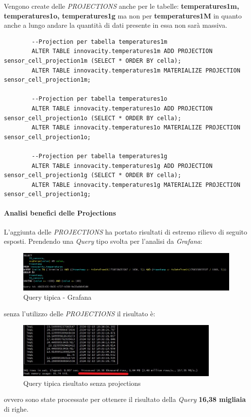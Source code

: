     Vengono create delle \textit{PROJECTIONS} anche per le tabelle:  \textbf{temperatures1m, temperatures1o, temperatures1g}
    ma non per  \textbf{temperatures1M} in quanto anche a lungo andare la quantità di dati presente in essa non sarà massiva.

    \begin{lstlisting}
        --Projection per tabella temperatures1m
        ALTER TABLE innovacity.temperatures1m ADD PROJECTION sensor_cell_projection1m (SELECT * ORDER BY cella);
        ALTER TABLE innovacity.temperatures1m MATERIALIZE PROJECTION sensor_cell_projection1m;

        --Projection per tabella temperatures1o
        ALTER TABLE innovacity.temperatures1o ADD PROJECTION sensor_cell_projection1o (SELECT * ORDER BY cella);
        ALTER TABLE innovacity.temperatures1o MATERIALIZE PROJECTION sensor_cell_projection1o;

        --Projection per tabella temperatures1g
        ALTER TABLE innovacity.temperatures1g ADD PROJECTION sensor_cell_projection1g (SELECT * ORDER BY cella);
        ALTER TABLE innovacity.temperatures1g MATERIALIZE PROJECTION sensor_cell_projection1g;
    \end{lstlisting}

    \paragraph{Analisi benefici delle Projections}\label{sec:temp_projections_benefici}
    L'aggiunta delle \textit{PROJECTIONS} ha portato risultati di estremo rilievo di seguito esposti.
    Prendendo una \textit{Query} tipo svolta per l'analisi da \textit{Grafana}:
    \begin{figure}[H]
        \centering
        \includegraphics[width=1\textwidth]{../Images/SpecificaTecnica/ProjectionQuery.jpg}
        \caption{Query tipica - Grafana}
        \label{fig:ProjectionsQuery}
      \end{figure}
    senza l'utilizzo delle \textit{PROJECTIONS} il risultato è:
    \begin{figure}[H]
        \centering
        \includegraphics[width=0.9\textwidth]{../Images/SpecificaTecnica/SenzaProectionResult.jpg}
        \caption{Query tipica risultato senza projections}
        \label{fig:ProjectionsQueryWthout}
      \end{figure}
      ovvero sono state processate per ottenere il risultato della \textit{Query} \textbf{16,38 migliaia} di righe.

